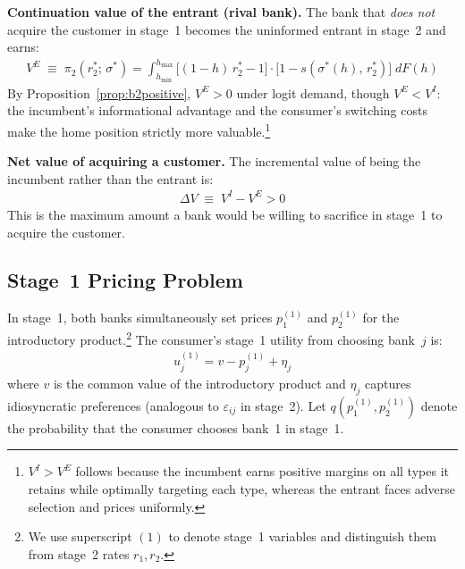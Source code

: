 \documentclass[12pt]{article}
\theoremstyle{plain}
\theoremstyle{plain}
\theoremstyle{definition}  %
\theoremstyle{remark}  %
\begin{document}
\medskip\noindent
\textbf{Continuation value of the entrant (rival bank).} The bank that \emph{does not} acquire the customer in stage~1 becomes the uninformed entrant in stage~2 and earns:
\begin{align}\label{eq:V_E}
    V^{E} \;\equiv\; \pi_2(r_2^*;\, \sigma^*) = \int_{h_{\min}}^{h_{\max}} \big[(1-h)\,r_2^* - 1\big] \cdot \big[1 - s(\sigma^*(h),\, r_2^*)\big] \; dF(h)
\end{align}
By Proposition~\ref{prop:b2positive}, $V^E > 0$ under logit demand, though $V^E < V^I$: the incumbent's informational advantage and the consumer's switching costs make the home position strictly more valuable.\footnote{$V^I > V^E$ follows because the incumbent earns positive margins on all types it retains while optimally targeting each type, whereas the entrant faces adverse selection and prices uniformly.}

\medskip\noindent
\textbf{Net value of acquiring a customer.} The incremental value of being the incumbent rather than the entrant is:
\begin{align}\label{eq:DeltaV}
    \Delta V \;\equiv\; V^I - V^E > 0
\end{align}
This is the maximum amount a bank would be willing to sacrifice in stage~1 to acquire the customer.

\subsection{Stage~1 Pricing Problem}


\bigskip

In stage~1, both banks simultaneously set prices $p_1^{(1)}$ and $p_2^{(1)}$ for the introductory product.\footnote{We use superscript $(1)$ to denote stage~1 variables and distinguish them from stage~2 rates $r_1, r_2$.} The consumer's stage~1 utility from choosing bank~$j$ is:
\begin{align}\label{eq:u_stage1}
    u_j^{(1)} = v - p_j^{(1)} + \eta_j
\end{align}
where $v$ is the common value of the introductory product and $\eta_j$ captures idiosyncratic preferences (analogous to $\varepsilon_{ij}$ in stage~2). Let $q(p_1^{(1)}, p_2^{(1)})$ denote the probability that the consumer chooses bank~1 in stage~1.
\end{document}
